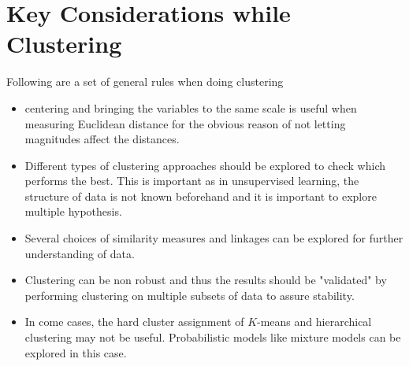 \documentclass[../statistical_learning_notes.tex]{subfiles}
\begin{document}
    \section{Key Considerations while Clustering}
    Following are a set of general rules when doing clustering
    \begin{itemize}
        \item centering and bringing the variables to the same scale is useful when measuring Euclidean distance for the obvious reason of not letting magnitudes affect the distances.
        \item Different types of clustering approaches should be explored to check which performs the best. This is important as in unsupervised learning, the structure of data is not known beforehand and it is important to explore multiple hypothesis.
        \item Several choices of similarity measures and linkages can be explored for further understanding of data.
        \item Clustering can be non robust and thus the results should be "validated" by performing clustering on multiple subsets of data to assure stability.
        \item In come cases, the hard cluster assignment of $K$-means and hierarchical clustering may not be useful. Probabilistic models like mixture models can be explored in this case.
    \end{itemize}
\end{document}
